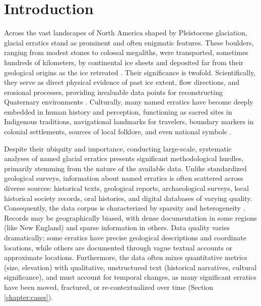 \documentclass[
11pt, %
english, %
singlespacing, %
headsepline, %
]{MastersDoctoralThesis} %
\begin{document}
\tableofcontents %

\listoffigures %

\listoftables %


\mainmatter %

\pagestyle{thesis} %


\chapter{Introduction}
\label{chapter:intro}
Across the vast landscapes of North America shaped by Pleistocene glaciation, glacial erratics stand as prominent and often enigmatic features. These boulders, ranging from modest stones to colossal megaliths, were transported, sometimes hundreds of kilometers, by continental ice sheets and deposited far from their geological origins as the ice retreated \cite{Flint1971, Benn2010}. Their significance is twofold. Scientifically, they serve as direct physical evidence of past ice extent, flow directions, and erosional processes, providing invaluable data points for reconstructing Quaternary environments \cite{Cuffey2010}. Culturally, many named erratics have become deeply embedded in human history and perception, functioning as sacred sites in Indigenous traditions, navigational landmarks for travelers, boundary markers in colonial settlements, sources of local folklore, and even national symbols \cite{Seelye1997, Lenik2009, Dempsey1997}.

Despite their ubiquity and importance, conducting large-scale, systematic analyses of named glacial erratics presents significant methodological hurdles, primarily stemming from the nature of the available data. Unlike standardized geological surveys, information about named erratics is often scattered across diverse sources: historical texts, geological reports, archaeological surveys, local historical society records, oral histories, and digital databases of varying quality. Consequently, the data corpus is characterized by sparsity and heterogeneity \cite{Gregory2013}. Records may be geographically biased, with dense documentation in some regions (like New England) and sparse information in others. Data quality varies dramatically; some erratics have precise geological descriptions and coordinate locations, while others are documented through vague textual accounts or approximate locations. Furthermore, the data often mixes quantitative metrics (size, elevation) with qualitative, unstructured text (historical narratives, cultural significance), and must account for temporal changes, as many significant erratics have been moved, fractured, or re-contextualized over time (Section \ref{chapter:cases}).
\end{document}
